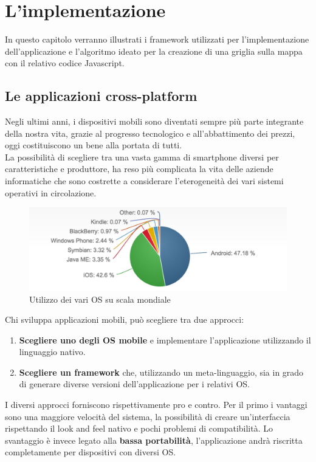 \chapter{L'implementazione}
In questo capitolo verranno illustrati i framework utilizzati per l'implementazione dell'applicazione e l'algoritmo ideato per la creazione di una griglia sulla mappa con il relativo codice Javascript.
\section{Le applicazioni cross-platform}
Negli ultimi anni, i dispositivi mobili sono diventati sempre più parte integrante della nostra vita, grazie al progresso tecnologico e all'abbattimento dei prezzi, oggi costituiscono un bene alla portata di tutti. \\
La possibilità di scegliere tra una vasta gamma di smartphone diversi per caratteristiche e produttore, ha reso più complicata la vita delle aziende informatiche che sono costrette a considerare l'eterogeneità dei vari sistemi operativi in circolazione.\\
\begin{figure}[H]
	\centering
	\includegraphics[scale=0.7]{Implementazione/os.png}
	\caption{Utilizzo dei vari OS su scala mondiale}
	\label{fig:os_mobile}
\end{figure}
\newpage
Chi sviluppa applicazioni mobili, può scegliere tra due approcci:
\begin{enumerate}
\item \textbf{Scegliere uno degli OS mobile} e implementare l'applicazione utilizzando il linguaggio nativo.
\item \textbf{Scegliere un framework }che, utilizzando un meta-linguaggio, sia in grado di generare diverse versioni dell'applicazione per i relativi OS.
\end{enumerate}
I diversi approcci forniscono rispettivamente pro e contro. Per il primo i vantaggi sono una maggiore velocità del sistema, la possibilità di creare un'interfaccia rispettando il look and feel nativo e pochi problemi di compatibilità. Lo svantaggio è invece legato alla \textbf{bassa portabilità}, l'applicazione andrà riscritta completamente per dispositivi con diversi OS. \\
